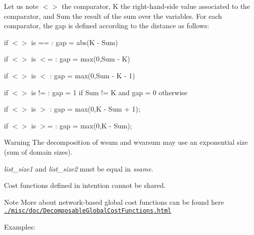 \documentclass{article}
\begin{document}
\begin{DoxyItemize}
\begin{DoxyItemize}
Let us note $<$$>$ the comparator, K the right-\/hand-\/side value associated to the comparator, and Sum the result of the sum over the variables. For each comparator, the gap is defined according to the distance as follows\-:
\begin{DoxyItemize}
\item if $<$$>$ is == \-: gap = abs(K -\/ Sum)
\item if $<$$>$ is $<$= \-: gap = max(0,Sum -\/ K)
\item if $<$$>$ is $<$ \-: gap = max(0,Sum -\/ K -\/ 1)
\item if $<$$>$ is != \-: gap = 1 if Sum != K and gap = 0 otherwise
\item if $<$$>$ is $>$ \-: gap = max(0,K -\/ Sum + 1);
\item if $<$$>$ is $>$= \-: gap = max(0,K -\/ Sum);
\end{DoxyItemize}
\end{DoxyItemize}
\end{DoxyItemize}\begin{DoxyWarning}{Warning}
The decomposition of wsum and wvarsum may use an exponential size (sum of domain sizes). 

{\itshape list\-\_\-size1} and {\itshape list\-\_\-size2} must be equal in {\itshape ssame}. 

Cost functions defined in intention cannot be shared.
\end{DoxyWarning}
\begin{DoxyNote}{Note}
More about network-\/based global cost functions can be found here \href{./misc/doc/DecomposableGlobalCostFunctions.html}{\tt ./misc/doc/DecomposableGlobalCostFunctions.html}
\end{DoxyNote}
Examples\-:
\end{document}

